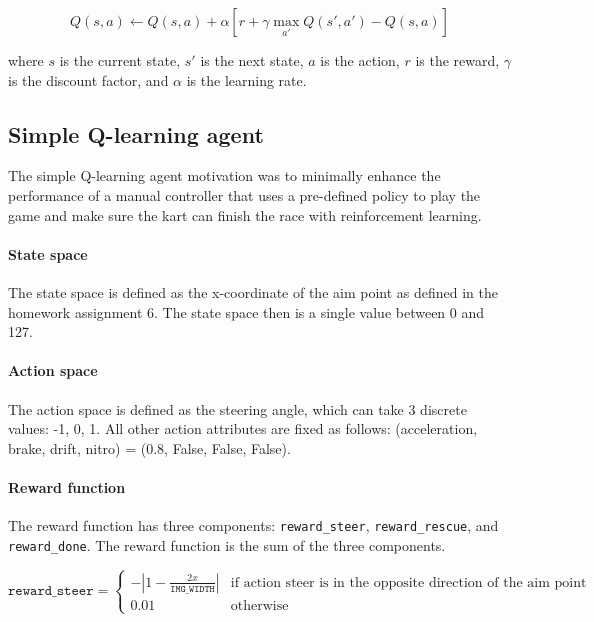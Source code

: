 \documentclass{article}
\begin{document}
\begin{equation}
    Q(s, a) \leftarrow Q(s, a) + \alpha [r + \gamma \max_{a'} Q(s', a') - Q(s, a)]
\end{equation}

where $s$ is the current state, $s'$ is the next state, $a$ is the action, $r$ is the reward, $\gamma$ is the discount factor, and $\alpha$ is the learning rate.

\subsection{Simple Q-learning agent}

The simple Q-learning agent motivation was to minimally enhance the performance of a manual controller that uses a pre-defined policy to play the game and make sure the kart can finish the race with reinforcement learning.

\paragraph{State space}

The state space is defined as the x-coordinate of the aim point as defined in the homework assignment 6. The state space then is a single value between 0 and 127.

\paragraph{Action space}

The action space is defined as the steering angle, which can take 3 discrete values: -1, 0, 1. All other action attributes are fixed as follows: (acceleration, brake, drift, nitro) = (0.8, False, False, False).

\paragraph{Reward function}

The reward function has three components: \texttt{reward\_steer}, \texttt{reward\_rescue}, and \texttt{reward\_done}. The reward function is the sum of the three components.

\begin{equation}
    \texttt{reward\_steer} = \begin{cases}
        -|1 - \frac{2x}{\texttt{IMG\_WIDTH}}| & \text{if action steer is in the opposite direction of the aim point} \\
        0.01 & \text{otherwise}
    \end{cases}
\end{equation}
\end{document}
